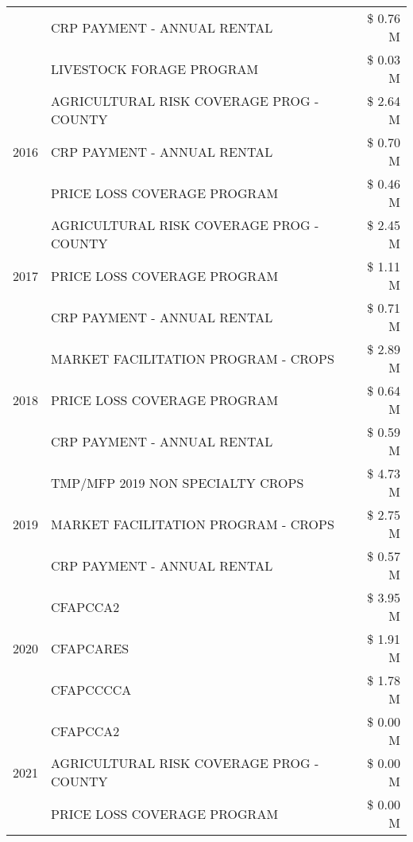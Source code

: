 \begin{tabular}{llr}
 & CRP PAYMENT - ANNUAL RENTAL & \$ 0.76 M \\
 & LIVESTOCK FORAGE PROGRAM & \$ 0.03 M \\
\cline{1-3}
\multirow[t]{3}{*}{2016} & AGRICULTURAL RISK COVERAGE PROG - COUNTY & \$ 2.64 M \\
 & CRP PAYMENT - ANNUAL RENTAL & \$ 0.70 M \\
 & PRICE LOSS COVERAGE PROGRAM & \$ 0.46 M \\
\cline{1-3}
\multirow[t]{3}{*}{2017} & AGRICULTURAL RISK COVERAGE PROG - COUNTY & \$ 2.45 M \\
 & PRICE LOSS COVERAGE PROGRAM & \$ 1.11 M \\
 & CRP PAYMENT - ANNUAL RENTAL & \$ 0.71 M \\
\cline{1-3}
\multirow[t]{3}{*}{2018} & MARKET FACILITATION PROGRAM - CROPS & \$ 2.89 M \\
 & PRICE LOSS COVERAGE PROGRAM & \$ 0.64 M \\
 & CRP PAYMENT - ANNUAL RENTAL & \$ 0.59 M \\
\cline{1-3}
\multirow[t]{3}{*}{2019} & TMP/MFP 2019 NON SPECIALTY CROPS & \$ 4.73 M \\
 & MARKET FACILITATION PROGRAM - CROPS & \$ 2.75 M \\
 & CRP PAYMENT - ANNUAL RENTAL & \$ 0.57 M \\
\cline{1-3}
\multirow[t]{3}{*}{2020} & CFAPCCA2 & \$ 3.95 M \\
 & CFAPCARES & \$ 1.91 M \\
 & CFAPCCCCA & \$ 1.78 M \\
\cline{1-3}
\multirow[t]{3}{*}{2021} & CFAPCCA2 & \$ 0.00 M \\
 & AGRICULTURAL RISK COVERAGE PROG - COUNTY & \$ 0.00 M \\
 & PRICE LOSS COVERAGE PROGRAM & \$ 0.00 M \\
\cline{1-3}
\bottomrule
\end{tabular}
